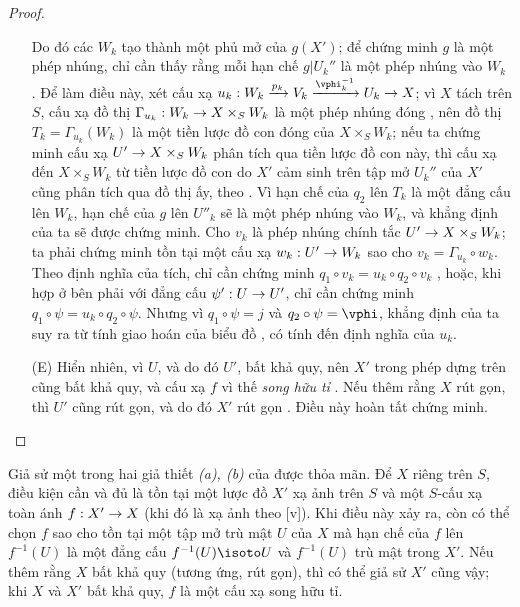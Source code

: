 \documentclass[oneside,10pt]{amsart}
\makeatletter
\newcommand{\ega@arrow}[2]{\mathchoice{#1}{#2}{#2}{#2}}
\renewcommand{\to}{\ega@arrow{\longrightarrow}{\rightarrow}}
\newcommand{\oldpage}[2][]{\marginnote{\normalfont\footnotesize\textbf{#1}~|~#2}\ignorespaces}
\let\EGAOriginalLabel\label
\renewcommand{\label}[1]{\phantomsection\EGAOriginalLabel{#1}}
\makeatother
\begin{document}
\begin{proof}
\begin{enumerate}
    Do đó các $W_k$ tạo thành một phủ mở của $g(X')$; để chứng minh $g$ là một phép nhúng, chỉ cần thấy rằng mỗi hạn chế $g|U_k''$ là một phép nhúng vào $W_k$ .
    Để làm điều này, xét cấu xạ $u_k:W_k\xrightarrow{p_k}V_k\xrightarrow{\vphi_k^{-1}}U_k\to X$; vì $X$ tách trên $S$, cấu xạ đồ thị $\Gamma_{u_k}:W_k\to X\times_S W_k$ là một phép nhúng đóng , nên đồ thị $T_k=\Gamma_{u_k}(W_k)$ là một tiền lược đồ con đóng của $X\times_S W_k$;
    nếu ta chứng minh cấu xạ $U'\to X\times_S W_k$ phân tích qua tiền lược đồ con này, thì cấu xạ đến $X\times_S W_k$ từ tiền lược đồ con do $X'$ cảm sinh trên tập mở $U_k''$ của $X'$ cũng phân tích qua đồ thị ấy, theo .
    Vì hạn chế của $q_2$ lên $T_k$ là một đẳng cấu lên $W_k$, hạn chế của $g$ lên $U''_k$ sẽ là một phép nhúng vào $W_k$, và khẳng định của ta sẽ được chứng minh.
    Cho $v_k$ là phép nhúng chính tắc $U'\to X\times_S W_k$; ta phải chứng minh tồn tại một cấu xạ $w_k:U'\to W_k$ sao cho $v_k=\Gamma_{u_k}\circ w_k$.
    Theo định nghĩa của tích, chỉ cần chứng minh $q_1\circ v_k=u_k\circ q_2\circ v_k$ , hoặc, khi hợp ở bên phải
\oldpage[II]{109}
với đẳng cấu $\psi':U\to U'$, chỉ cần chứng minh $q_1\circ\psi=u_k\circ q_2\circ\psi$.
Nhưng vì $q_1\circ\psi=j$ và $q_2\circ\psi=\vphi$, khẳng định của ta suy ra từ tính giao hoán của biểu đồ , có tính đến định nghĩa của $u_k$.
  \item[(E)] Hiển nhiên, vì $U$, và do đó $U'$, bất khả quy, nên $X'$ trong phép dựng trên cũng bất khả quy, và cấu xạ $f$ vì thế \emph{song hữu tỉ} .
    Nếu thêm rằng $X$ rút gọn, thì $U'$ cũng rút gọn, và do đó $X'$ rút gọn .
    Điều này hoàn tất chứng minh.
\end{enumerate}
\end{proof}

\begin{corollary}[5.6.2]
\label{II.5.6.2}
Giả sử một trong hai giả thiết \emph{(a), (b)} của  được thỏa mãn.
Để $X$ riêng trên $S$, điều kiện cần và đủ là tồn tại một lược đồ $X'$ xạ ảnh trên $S$ và một $S$-cấu xạ toàn ánh $f:X'\to X$ (khi đó là xạ ảnh theo [v]).
Khi điều này xảy ra, còn có thể chọn $f$ sao cho tồn tại một tập mở trù mật $U$ của $X$ mà hạn chế của $f$ lên $f^{-1}(U)$ là một đẳng cấu $f^{-1}(U)\isoto U$ và $f^{-1}(U)$ trù mật trong $X'$.
Nếu thêm rằng $X$ bất khả quy (tương ứng, rút gọn), thì có thể giả sử $X'$ cũng vậy; khi $X$ và $X'$ bất khả quy, $f$ là một cấu xạ song hữu tỉ.
\end{corollary}
\end{document}
